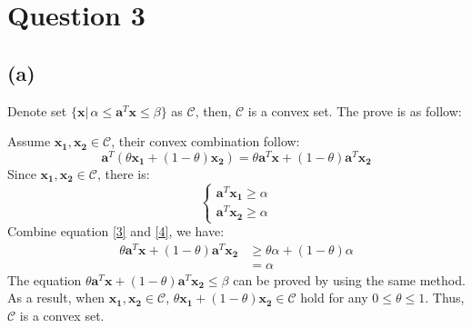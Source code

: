 \documentclass[10pt,a4paper]{article}
\begin{document}
\section*{Question 3}

\subsection*{(a)}
Denote set $\{ \mathbf{x} |\, \alpha \leq \mathbf{a}^{T}\mathbf{x} \leq \beta \}$ as $\mathcal{C}$, then, $\mathcal{C}$ is a convex set. The prove is as follow:

Assume $\mathbf{x_{1}}, \mathbf{x_{2}} \in \mathcal{C}$, their convex combination follow:
\begin{equation}
	\mathbf{a}^{T}(\theta \mathbf{x_{1}} + (1 - \theta) \mathbf{x_{2}}) = \theta \mathbf{a}^{T} \mathbf{x} + (1 - \theta) \mathbf{a}^{T} \mathbf{x_{2}}
	\label{3}
\end{equation}
Since $\mathbf{x_{1}}, \mathbf{x_{2}} \in \mathcal{C}$, there is:
\begin{equation}
	\begin{cases}
		\mathbf{a}^{T} \mathbf{x_{1}} \geq \alpha \\
		\mathbf{a}^{T} \mathbf{x_{2}} \geq \alpha
	\end{cases}
	\label{4}
\end{equation}
Combine equation \ref{3} and \ref{4}, we have:
\begin{align*}
	\theta \mathbf{a}^{T} \mathbf{x} + (1 - \theta) \mathbf{a}^{T} \mathbf{x_{2}} &\geq \theta \alpha + (1 - \theta) \alpha \\
	&= \alpha
\end{align*}
The equation $\theta \mathbf{a}^{T} \mathbf{x} + (1 - \theta) \mathbf{a}^{T} \mathbf{x_{2}} \leq \beta$ can be proved by using the same method. As a result, when $\mathbf{x_{1}}, \mathbf{x_{2}} \in \mathcal{C}$, $\theta \mathbf{x_{1}} + (1 - \theta) \mathbf{x_{2}} \in \mathcal{C}$ hold for any $0 \leq \theta \leq 1$. Thus, $\mathcal{C}$ is a convex set.
\end{document}
